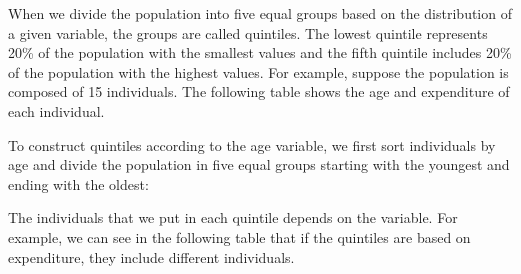 \documentclass[letterpaper]{article}\usepackage[]{graphicx}\usepackage[]{color}
\numberwithin{exer}{section}
\theoremstyle{nonumberplain}
\begin{document}
When we divide the population into five equal groups based on the
distribution of a given variable, the groups are called quintiles. The
lowest quintile represents 20\% of the population with the smallest
values and the fifth quintile includes 20\% of the population with the
highest values. For example, suppose the population is composed of 15
individuals. The following table shows the age and expenditure of each
individual.
\begin{center}
\end{center}
To construct quintiles according to the age variable, we first sort
individuals by age and divide the population in five equal groups
starting with the youngest and ending with the oldest:
\begin{center}
\end{center}
The individuals that we put in each quintile depends on the
variable. For example, we can see in the following table that if the
quintiles are based on expenditure, they include different
individuals.
\end{document}
